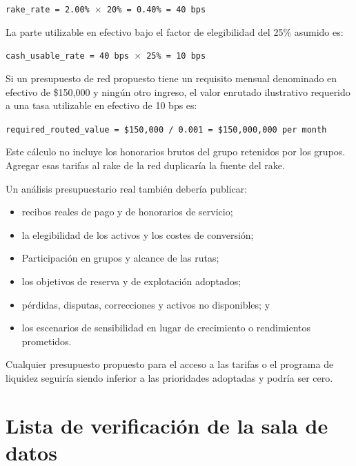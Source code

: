 \documentclass[11pt]{article}
\begin{document}
\texttt{rake\_rate = 2.00\% $\times$ 20\% = 0.40\% = 40 bps}

La parte utilizable en efectivo bajo el factor de elegibilidad del 25\% asumido es:

\texttt{cash\_usable\_rate = 40 bps $\times$ 25\% = 10 bps}

Si un presupuesto de red propuesto tiene un requisito mensual denominado en efectivo de \$150,000 y ningún otro ingreso, el valor enrutado ilustrativo requerido a una tasa utilizable en efectivo de 10 bps es:

\texttt{required\_routed\_value = \$150,000 / 0.001 = \$150,000,000 per month}

Este cálculo no incluye los honorarios brutos del grupo retenidos por los grupos. Agregar esas tarifas al rake de la red duplicaría la fuente del rake.

Un análisis presupuestario real también debería publicar:

\begin{itemize}[leftmargin=*]
\item recibos reales de pago y de honorarios de servicio;
\item la elegibilidad de los activos y los costes de conversión;
\item Participación en grupos y alcance de las rutas;
\item los objetivos de reserva y de explotación adoptados;
\item pérdidas, disputas, correcciones y activos no disponibles; y
\item los escenarios de sensibilidad en lugar de crecimiento o rendimientos prometidos.
\end{itemize}
Cualquier presupuesto propuesto para el acceso a las tarifas o el programa de liquidez seguiría siendo inferior a las prioridades adoptadas y podría ser cero.


\section*{Lista de verificación de la sala de datos}
\end{document}
